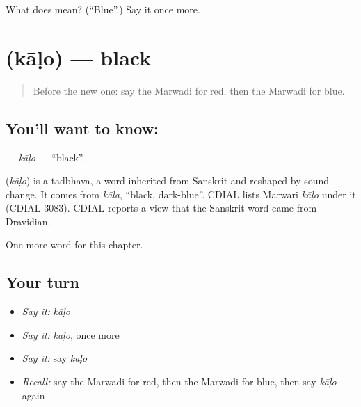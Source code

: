\begin{tcolorbox}[breakable,colback=teal!4,colframe=teal!35!black,title={Before you move on}]
What does  mean? (\textquotedblleft{}Blue\textquotedblright{}.) Say it once more.
\end{tcolorbox}
\section[\texorpdfstring{\mw{काळो} (kāḷo)}{काळो (kāḷo)}]{ (kāḷo) — black}

\label{lesson:MW-C77-kalo}



\begin{quote}
Before the new one: say the Marwadi for red, then the Marwadi for blue.
\end{quote}

\subsection*{You'll want to know: }
\textbf{} — \emph{kāḷo} — \textquotedblleft{}black\textquotedblright{}.

\begin{cousinweb}
\textbf{} (\emph{kāḷo}) is a tadbhava, a word inherited from Sanskrit and reshaped by sound change. It comes from \emph{kāla}, \textquotedblleft{}black, dark-blue\textquotedblright{}. CDIAL lists Marwari \emph{kāḷo} under it (CDIAL 3083). CDIAL reports a view that the Sanskrit word came from Dravidian.
\end{cousinweb}

\begin{grammarlens}[title={What you've built}]
One more word for this chapter.
\end{grammarlens}

\subsection*{Your turn}
\begin{itemize}
\raggedright
  \item \emph{Say it:} \emph{kāḷo}
  \item \emph{Say it:} \emph{kāḷo}, once more
  \item \emph{Say it:} say \emph{kāḷo}
  \item \emph{Recall:} say the Marwadi for red, then the Marwadi for blue, then say \emph{kāḷo} again
\end{itemize}


